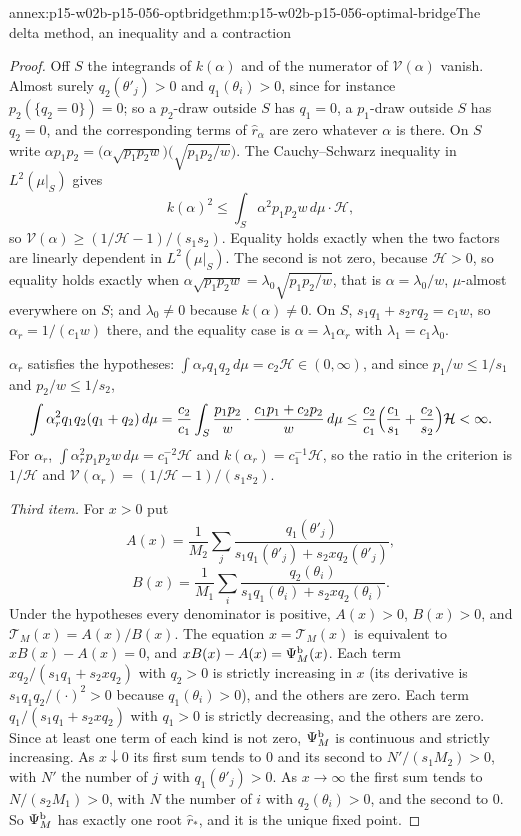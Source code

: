 \begin{annexitem}{annex:p15-w02b-p15-056-optbridge}{thm:p15-w02b-p15-056-optimal-bridge}{The delta method, an inequality and a contraction}
\begin{proof}
Off \(S\) the integrands of \(k(\alpha)\) and of the numerator of
\(\mathcal V(\alpha)\) vanish. Almost surely \(q_2(\theta'_j)>0\) and
\(q_1(\theta_i)>0\), since for instance \(p_2(\{q_2=0\})=0\); so a
\(p_2\)-draw outside \(S\) has \(q_1=0\), a \(p_1\)-draw outside \(S\) has
\(q_2=0\), and the corresponding terms of \(\widehat r_\alpha\) are zero
whatever \(\alpha\) is there. On \(S\) write
\(\alpha p_1p_2=\bigl(\alpha\sqrt{p_1p_2w}\bigr)\bigl(\sqrt{p_1p_2/w}\bigr)\).
The Cauchy--Schwarz inequality in \(L^2(\mu|_S)\) gives
\[
 k(\alpha)^2\leq\int_S\alpha^2p_1p_2w\,d\mu\cdot\mathcal H,
\]
so \(\mathcal V(\alpha)\geq(1/\mathcal H-1)/(s_1s_2)\). Equality holds
exactly when the two factors are linearly dependent in \(L^2(\mu|_S)\).
The second is not zero, because \(\mathcal H>0\), so equality holds
exactly when \(\alpha\sqrt{p_1p_2w}=\lambda_0\sqrt{p_1p_2/w}\), that is
\(\alpha=\lambda_0/w\), \(\mu\)-almost everywhere on \(S\); and
\(\lambda_0\neq0\) because \(k(\alpha)\neq0\). On \(S\),
\(s_1q_1+s_2rq_2=c_1w\), so \(\alpha_r=1/(c_1w)\) there, and the
equality case is \(\alpha=\lambda_1\alpha_r\) with \(\lambda_1=c_1\lambda_0\).

\(\alpha_r\) satisfies the hypotheses: \(\int\alpha_rq_1q_2\,d\mu
=c_2\mathcal H\in(0,\infty)\), and since \(p_1/w\leq1/s_1\) and
\(p_2/w\leq1/s_2\),
\[
 \int\alpha_r^2q_1q_2(q_1+q_2)\,d\mu
 =\frac{c_2}{c_1}\int_S\frac{p_1p_2}w\cdot\frac{c_1p_1+c_2p_2}w\,d\mu
 \leq\frac{c_2}{c_1}\Bigl(\frac{c_1}{s_1}+\frac{c_2}{s_2}\Bigr)\mathcal H<\infty .
\]
For \(\alpha_r\), \(\int\alpha_r^2p_1p_2w\,d\mu=c_1^{-2}\mathcal H\) and
\(k(\alpha_r)=c_1^{-1}\mathcal H\), so the ratio in the criterion is
\(1/\mathcal H\) and \(\mathcal V(\alpha_r)=(1/\mathcal H-1)/(s_1s_2)\).

\emph{Third item.} For \(x>0\) put
\[
 A(x)=\frac1{M_2}\sum_j\frac{q_1(\theta'_j)}{s_1q_1(\theta'_j)+s_2xq_2(\theta'_j)},
\]
\[
 B(x)=\frac1{M_1}\sum_i\frac{q_2(\theta_i)}{s_1q_1(\theta_i)+s_2xq_2(\theta_i)} .
\]
Under the hypotheses every denominator is positive, \(A(x)>0\),
\(B(x)>0\), and \(\mathcal T_M(x)=A(x)/B(x)\). The equation
\(x=\mathcal T_M(x)\) is equivalent to \(xB(x)-A(x)=0\), and
\(xB(x)-A(x)=\Psi^{\rm b}_M(x)\). Each term \(xq_2/(s_1q_1+s_2xq_2)\) with
\(q_2>0\) is strictly increasing in \(x\) (its derivative is
\(s_1q_1q_2/(\cdot)^2>0\) because \(q_1(\theta_i)>0\)), and the others are
zero. Each term \(q_1/(s_1q_1+s_2xq_2)\) with \(q_1>0\) is strictly
decreasing, and the others are zero. Since at least one term of each kind
is not zero, \(\Psi^{\rm b}_M\) is continuous and strictly increasing. As
\(x\downarrow0\) its first sum tends to \(0\) and its second to
\(N'/(s_1M_2)>0\), with \(N'\) the number of \(j\) with
\(q_1(\theta'_j)>0\). As \(x\to\infty\) the first sum tends to
\(N/(s_2M_1)>0\), with \(N\) the number of \(i\) with \(q_2(\theta_i)>0\),
and the second to \(0\). So \(\Psi^{\rm b}_M\) has exactly one root
\(\widehat r_*\), and it is the unique fixed point.


\end{proof}
\end{annexitem}
